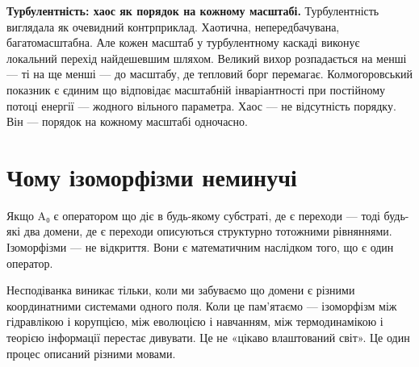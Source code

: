 \documentclass[12pt, a4paper, openany]{book}
\begin{document}
\textbf{Турбулентність: хаос як порядок на кожному масштабі.} Турбулентність виглядала як очевидний контрприклад. Хаотична, непередбачувана, багатомасштабна. Але кожен масштаб у турбулентному каскаді виконує локальний перехід найдешевшим шляхом. Великий вихор розпадається на менші --- ті на ще менші --- до масштабу, де тепловий борг перемагає. Колмогоровський показник є єдиним що відповідає масштабній інваріантності при постійному потоці енергії --- жодного вільного параметра. Хаос — не відсутність порядку. Він — порядок на кожному масштабі одночасно.

\section{Чому ізоморфізми неминучі}

Якщо A₀ є оператором що діє в будь-якому субстраті, де є переходи --- тоді будь-які два домени, де є переходи описуються структурно тотожними рівняннями. Ізоморфізми — не відкриття. Вони є математичним наслідком того, що є один оператор.

Несподіванка виникає тільки, коли ми забуваємо що домени є різними координатними системами одного поля. Коли це пам'ятаємо --- ізоморфізм між гідравлікою і корупцією, між еволюцією і навчанням, між термодинамікою і теорією інформації перестає дивувати. Це не «цікаво влаштований світ». Це один процес описаний різними мовами.
\end{document}
